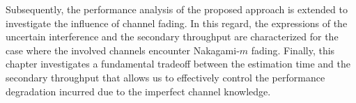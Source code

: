 Subsequently, the performance analysis of the proposed approach is extended to investigate the influence of channel fading. In this regard, the expressions of the uncertain interference and the secondary throughput are characterized for the case where the involved channels encounter Nakagami-$m$ fading. Finally, this chapter investigates a fundamental tradeoff between the estimation time and the secondary throughput that allows us to effectively control the performance degradation incurred due to the imperfect channel knowledge.%


